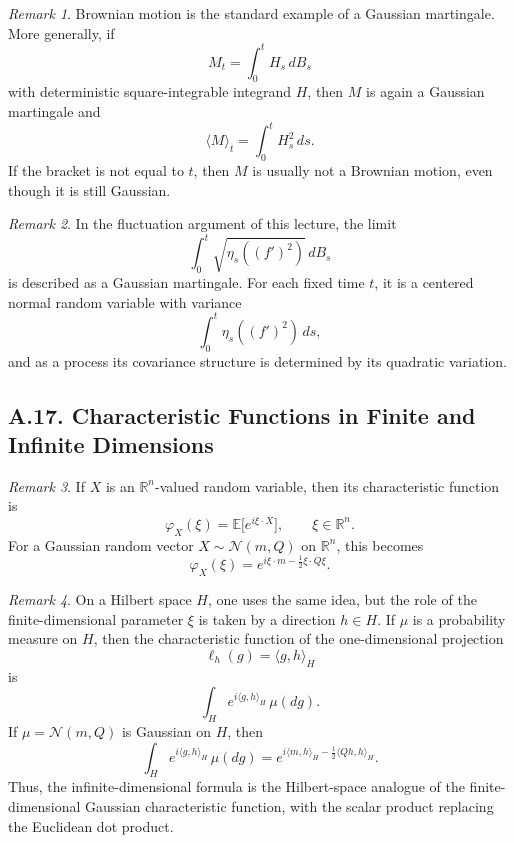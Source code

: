\documentclass[11pt]{article}
\theoremstyle{definition}
\theoremstyle{remark}
\newtheorem{remark}{Remark}
\begin{document}
\begin{remark}
Brownian motion is the standard example of a Gaussian martingale. More generally, if
\[
M_t=\int_0^t H_s\,dB_s
\]
with deterministic square-integrable integrand $H$, then $M$ is again a Gaussian martingale and
\[
\langle M\rangle_t=\int_0^t H_s^2\,ds.
\]
If the bracket is not equal to $t$, then $M$ is usually not a Brownian motion, even though it is still Gaussian.
\end{remark}

\begin{remark}
In the fluctuation argument of this lecture, the limit
\[
\int_0^t \sqrt{\eta_s((f')^2)}\,dB_s
\]
is described as a Gaussian martingale. For each fixed time $t$, it is a centered normal random variable with variance
\[
\int_0^t \eta_s((f')^2)\,ds,
\]
and as a process its covariance structure is determined by its quadratic variation.
\end{remark}

\subsection*{A.17. Characteristic Functions in Finite and Infinite Dimensions}
\begin{remark}
If $X$ is an $\mathbb R^n$-valued random variable, then its characteristic function is
\[
\varphi_X(\xi)=\mathbb E\bigl[e^{i\xi\cdot X}\bigr],
\qquad
\xi\in\mathbb R^n.
\]
For a Gaussian random vector $X\sim \mathcal N(m,Q)$ on $\mathbb R^n$, this becomes
\[
\varphi_X(\xi)=e^{i\xi\cdot m-\frac12 \xi\cdot Q\xi}.
\]
\end{remark}

\begin{remark}
On a Hilbert space $H$, one uses the same idea, but the role of the finite-dimensional parameter $\xi$ is taken by a direction $h\in H$. If $\mu$ is a probability measure on $H$, then the characteristic function of the one-dimensional projection
\[
\ell_h(g)=\langle g,h\rangle_H
\]
is
\[
\int_H e^{i\langle g,h\rangle_H}\,\mu(dg).
\]
If $\mu=\mathcal N(m,Q)$ is Gaussian on $H$, then
\[
\int_H e^{i\langle g,h\rangle_H}\,\mu(dg)
=
e^{i\langle m,h\rangle_H-\frac12\langle Qh,h\rangle_H}.
\]
Thus, the infinite-dimensional formula is the Hilbert-space analogue of the finite-dimensional Gaussian characteristic function, with the scalar product replacing the Euclidean dot product.
\end{remark}
\end{document}
